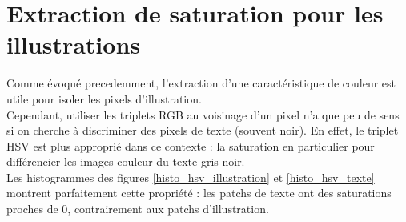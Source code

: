 \documentclass{book}
\begin{document}
\section{Extraction de saturation pour les illustrations}

Comme évoqué precedemment, l'extraction d'une caractéristique de couleur est utile pour isoler les pixels d'illustration.\\
Cependant, utiliser les triplets RGB au voisinage d'un pixel n'a que peu de sens si on cherche à discriminer des pixels de texte (souvent noir).
En effet, le triplet HSV est plus approprié dans ce contexte : la saturation en particulier pour différencier les images couleur du texte gris-noir.\\
Les histogrammes des figures \ref{histo_hsv_illustration} et \ref{histo_hsv_texte} montrent parfaitement cette propriété : les patchs de texte ont des saturations
proches de 0, contrairement aux patchs d'illustration.\\
\end{document}
